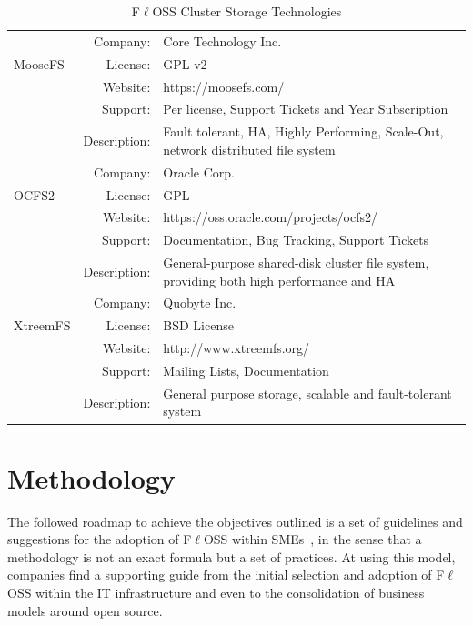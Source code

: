 \documentclass[a4paper, 12pt]{book}
\begin{document}
\begin{table}[H]
\begin{tabular}{ | m{2cm} | r  m{10cm} | }
    \hline
		& Company: & Core Technology Inc. \\
      MooseFS	& License: & GPL v2 \\
		& Website: & https://moosefs.com/ \\
		& Support: & Per license, Support Tickets and Year Subscription\\
	 	& Description: & Fault tolerant, HA, Highly Performing, Scale-Out, network distributed file system \\
    \hline
		& Company: & Oracle Corp. \\
      	OCFS2	& License: & GPL \\
		& Website: & https://oss.oracle.com/projects/ocfs2/ \\
		& Support: & Documentation, Bug Tracking, Support Tickets \\
	 	& Description: & General-purpose shared-disk cluster file system, providing both high performance and HA \\
    \hline
		& Company: & Quobyte Inc. \\
      XtreemFS	& License: & BSD License \\
		& Website: & http://www.xtreemfs.org/ \\
		& Support: & Mailing Lists, Documentation \\
	 	& Description: & General purpose storage, scalable and fault-tolerant system \\
    \hline

  \end{tabular}
  \caption{F$\ell$OSS Cluster Storage Technologies}
\label{table:cluster_filesystems}
\end{table}

%     


%
\chapter{Methodology}
\label{chap:methodology}

The followed roadmap to achieve the objectives outlined is a set of guidelines and suggestions for the adoption of F$\ell$OSS within SMEs~\cite{Daffara1}, in the sense that a methodology is not an exact formula but a set of practices. At using this model, companies find a supporting guide from the initial selection and adoption of F$\ell$OSS within the IT infrastructure and even to the consolidation of business models around open source.\bigskip
\end{document}
